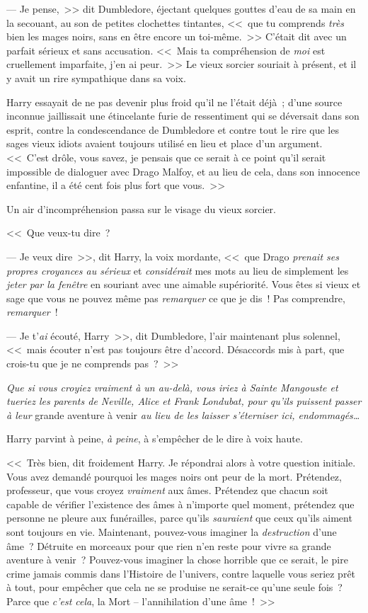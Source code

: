 --- Je pense,~>> dit Dumbledore, éjectant quelques gouttes d'eau de sa main en la secouant, au son de petites clochettes tintantes, <<~que tu comprends \emph{très} bien les mages noirs, sans en être encore un toi-même.~>> C'était dit avec un parfait sérieux et sans accusation. <<~Mais ta compréhension de \emph{moi} est cruellement imparfaite, j'en ai peur.~>> Le vieux sorcier souriait à présent, et il y avait un rire sympathique dans sa voix.

Harry essayait de ne pas devenir plus froid qu'il ne l'était déjà~; d'une source inconnue jaillissait une étincelante furie de ressentiment qui se déversait dans son esprit, contre la condescendance de Dumbledore et contre tout le rire que les sages vieux idiots avaient toujours utilisé en lieu et place d'un argument. <<~C'est drôle, vous savez, je pensais que ce serait à ce point qu'il serait impossible de dialoguer avec Drago Malfoy, et au lieu de cela, dans son innocence enfantine, il a été cent fois plus fort que vous.~>>

Un air d'incompréhension passa sur le visage du vieux sorcier.

<<~Que veux-tu dire~?

--- Je veux dire~>>, dit Harry, la voix mordante, <<~que Drago \emph{prenait ses propres croyances au sérieux} et \emph{considérait} mes mots au lieu de simplement les \emph{jeter par la fenêtre} en souriant avec une aimable supériorité. Vous êtes si vieux et sage que vous ne pouvez même pas \emph{remarquer} ce que je dis~! Pas comprendre, \emph{remarquer}~!

--- Je t'\emph{ai} écouté, Harry~>>, dit Dumbledore, l'air maintenant plus solennel, <<~mais écouter n'est pas toujours être d'accord. Désaccords mis à part, que crois-tu que je ne comprends pas~?~>>

\emph{Que si vous croyiez vraiment à un au-delà, vous iriez à Sainte Mangouste et tueriez les parents de Neville, Alice et Frank Londubat, pour qu'ils puissent passer à leur} grande aventure à venir \emph{au lieu de les laisser s'éterniser ici, endommagés…}

Harry parvint à peine, \emph{à peine}, à s'empêcher de le dire à voix haute.

<<~Très bien, dit froidement Harry. Je répondrai alors à votre question initiale. Vous avez demandé pourquoi les mages noirs ont peur de la mort. Prétendez, professeur, que vous croyez \emph{vraiment} aux âmes. Prétendez que chacun soit capable de vérifier l'existence des âmes à n'importe quel moment, prétendez que personne ne pleure aux funérailles, parce qu'ils \emph{sauraient} que ceux qu'ils aiment sont toujours en vie. Maintenant, pouvez-vous imaginer la \emph{destruction} d'une âme~? Détruite en morceaux pour que rien n'en reste pour vivre sa grande aventure à venir~? Pouvez-vous imaginer la chose horrible que ce serait, le pire crime jamais commis dans l'Histoire de l'univers, contre laquelle vous seriez prêt à tout, pour empêcher que cela ne se produise ne serait-ce qu'une seule fois~? Parce que \emph{c'est cela}, la Mort -- l'annihilation d'une âme~!~>>

